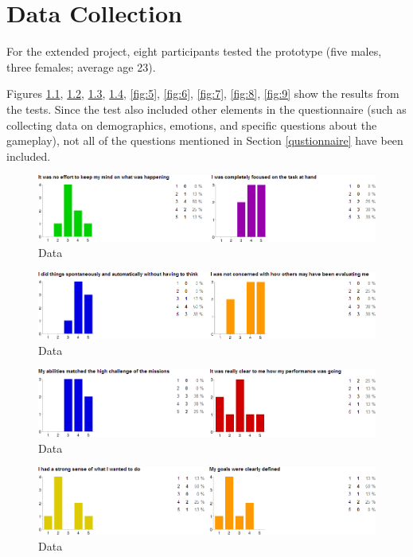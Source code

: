 \chapter{Data Collection}
For the extended project, eight participants tested the prototype (five males, three females; average age 23).

Figures \ref{fig:1}, \ref{fig:2}, \ref{fig:3}, \ref{fig:4}, \ref{fig:5}, \ref{fig:6}, \ref{fig:7}, \ref{fig:8}, \ref{fig:9} show the results from the tests. Since the test also included other elements in the questionnaire (such as collecting data on demographics, emotions, and specific questions about the gameplay), not all of the questions mentioned in Section \ref{qustionnaire} have been included.

\begin{figure}[htbp]
\centering
\includegraphics[width=1.0\textwidth]{Pictures/flow_1_focus}
\caption{Data}
\label{fig:1}
\end{figure}

\begin{figure}[htbp]
\centering
\includegraphics[width=1.0\textwidth]{Pictures/flow_2_social}
\caption{Data}
\label{fig:2}
\end{figure}

\begin{figure}[htbp]
\centering
\includegraphics[width=1.0\textwidth]{Pictures/flow_3_senseOfControl}
\caption{Data}
\label{fig:3}
\end{figure}

\begin{figure}[htbp]
\centering
\includegraphics[width=1.0\textwidth]{Pictures/flow_4_senseOfControl}
\caption{Data}
\label{fig:4}
\end{figure}

